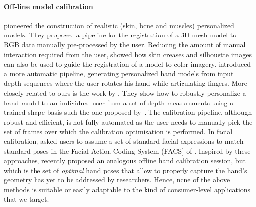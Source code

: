\paragraph{Off-line model calibration}
 pioneered the construction of realistic (skin, bone and muscles) personalized models. They proposed a pipeline for the registration of a 3D mesh model to RGB data manually pre-processed by the user. Reducing the amount of manual interaction required from the user,  showed how skin creases and silhouette images can also be used to guide the registration of a model to color imagery.  introduced a more automatic pipeline, generating personalized hand models from input depth sequences where the user rotates his hand while articulating fingers. More closely related to ours is the work by . They show how to robustly personalize a hand model to an individual user from a set of depth measurements using a trained shape basis such the one proposed by~. The calibration pipeline, although robust and efficient, is not fully automated as the user needs to manually pick the set of frames over which the calibration optimization is performed. 
In facial calibration,  asked users to assume a set of standard facial expressions to match standard poses in the Facial Action Coding System (FACS) of .
Inspired by these approaches,  recently proposed an analogous offline hand calibration session, but which is the set of \emph{optimal} hand poses that allow to properly capture the hand's geometry has yet to be addressed by researchers. Hence, none of the above methods is suitable or easily adaptable to the kind of consumer-level applications that we target.


